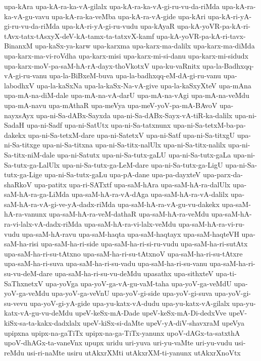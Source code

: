 {upa-kAra
upa-kA-ra-ka-vA-gilalx
upa-kA-ra-ka-vA-gi-ru-vu-da-riMda
upa-kA-ra-ka-vA-gu-vavu
upa-kA-ra-ka-veMba
upa-kA-ra-vA-gide
upa-kAri
upa-kA-ri-yA-gi-ru-vu-da-riMda
upa-kA-ri-yA-gi-ru-vudu
upa-kAyaR
upa-kA-yoVR-pa-kA-ri-tAvx-tatx-tAsxyX-deV-kA-tamx-ta-tatxvX-kamf
upa-kA-yoVR-pa-kA-ri-tavx-BinanxM
upa-kaSx-ya-karw
upa-karxma
upa-karx-ma-dalilx
upa-karx-ma-diMda
upa-karx-ma-vi-roVdha
upa-karx-misi
upa-karx-mi-si-danu
upa-karx-mi-sidudx
upa-karx-moV-pa-saM-hA-rA-dayx-thoVkotxV
upa-ku-vaRnitx
upa-la-Badhxqq-vA-gi-ru-vanu
upa-la-BiBxeM-buva
upa-la-badhxqq-eM-dA-gi-ru-vanu
upa-labodhxV
upa-la-kaSxNa
upa-la-kaSx-Na-vA-give
upa-la-kaSxyXteV
upa-mAna
upa-mA-na-diM-dale
upa-mA-na-vA-darU
upa-mA-na-vAgi
upa-mA-na-veMdu
upa-mA-navu
upa-mAthaR
upa-meVya
upa-meV-yoV-pa-mA-BAvoV
upa-nayxsAyx
upa-ni-Sa-dABx-Sayxda
upa-ni-Sa-dABx-Sayx-vA-tiR-ka-dalilx
upa-ni-SadaH
upa-ni-Sadf
upa-ni-SatUtx
upa-ni-Sa-tatxnunx
upa-ni-Sa-tetxM-ba-pa-dakekx
upa-ni-Sa-tetxM-dare
upa-ni-SatetxV
upa-ni-Satf
upa-ni-Sa-titxgU
upa-ni-Sa-titxge
upa-ni-Sa-titxna
upa-ni-Sa-titx-nalUlx
upa-ni-Sa-titx-nalilx
upa-ni-Sa-titx-niM-dale
upa-ni-Satutx
upa-ni-Sa-tutx-gaLU
upa-ni-Sa-tutx-gaLa
upa-ni-Sa-tutx-ga-LalUlx
upa-ni-Sa-tutx-ga-LeM-dare
upa-ni-Sa-tutx-ga-LigU
upa-ni-Sa-tutx-ga-Lige
upa-ni-Sa-tutx-gaLu
upa-pA-dane
upa-pa-dayxteV
upa-parx-da-shaRkoV
upa-patitx
upa-ri-SATxtf
upa-saM-hAra
upa-saM-hA-ra-dalUlx
upa-saM-hA-ra-ga-LiMda
upa-saM-hA-ra-vA-dAga
upa-saM-hA-ra-vA-dalilx
upa-saM-hA-ra-vA-gi-ve-yA-dadx-riMda
upa-saM-hA-ra-vA-gu-vu-dakekx
upa-saM-hA-ra-vanunx
upa-saM-hA-ra-veM-dathaR
upa-saM-hA-ra-veMdu
upa-saM-hA-ra-vi-lalx-vA-dadx-riMda
upa-saM-hA-ra-vi-lalx-veMdu
upa-saM-hA-ra-vi-ru-vudu
upa-saM-hA-ravu
upa-saM-haqta
upa-saM-haqtayx
upa-saM-haqteVH
upa-saM-ha-risi
upa-saM-ha-ri-side
upa-saM-ha-ri-si-ru-vudu
upa-saM-ha-ri-sutAtx
upa-saM-ha-ri-su-tAtxno
upa-saM-ha-ri-su-tAtxnoV
upa-saM-ha-ri-su-tAtxre
upa-saM-ha-ri-suva
upa-saM-ha-ri-su-vadu
upa-saM-ha-ri-su-vanu
upa-saM-ha-ri-su-vu-deM-dare
upa-saM-ha-ri-su-vu-deMdu
upasathx
upa-sithxteV
upa-ti-SaThxnetxV
upa-yoVga
upa-yoV-ga-vA-gu-vaM-taha
upa-yoV-ga-veMdU
upa-yoV-ga-veMdu
upa-yoV-ga-veVnU
upa-yoV-gi-side
upa-yoV-gi-suva
upa-yoV-gi-su-vevu
upa-yoV-gi-yA-gide
upa-yu-katx-vA-dudu
upa-yu-katx-vA-gilalx
upa-yu-katx-vA-gu-vu-deMdu
upeV-keSx-mA-Dade
upeV-keSx-mA-Di-dedxVve
upeV-kiSx-sa-ta-kakx-dadxlalx
upeV-kiSx-si-daMte
upeV-yA-diV-shavxraM
upeVya
upipxna
upipx-na-gaTiTx
upipx-na-ga-TiTx-yanunx
upoV-dAGx-ta-satxthA
upoV-dhAGx-ta-vaneVnx
upupx
uridu
uri-yuva
uri-yu-vaMte
uri-yu-vudu
usi-reMdu
usi-ri-naMte
usiru
utAkxrXMti
utAkxrXM-ti-yanunx
utAkxrXnoVtx
}
